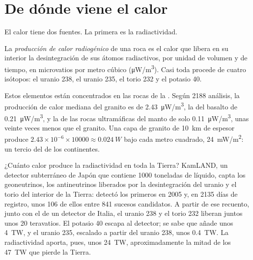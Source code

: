 \section{De dónde viene el calor}

El calor tiene dos fuentes. La primera es la radiactividad.

\begin{definition}\label{def:g12:internal-heat:heat-production}
La \emph{producción de calor radiogénico}
de una roca es el calor que libera en su interior la desintegración de sus
átomos radiactivos, por unidad de volumen y de tiempo, en microvatios por
metro cúbico (\unit{\micro W/m^3}). Casi toda procede de cuatro isótopos: el
uranio 238, el uranio 235, el torio 232 y el potasio 40.
\end{definition}

Estos elementos están concentrados en las rocas de la .
Según 2188 análisis, la producción de calor mediana del granito es de
\qty{2.43}{\micro W/m^3}, la del basalto de \qty{0.21}{\micro W/m^3}, y la de
las rocas ultramáficas del manto de solo \qty{0.11}{\micro W/m^3}, unas veinte
veces menos que el granito. Una capa de granito de \qty{10}{km} de espesor
produce
$2.43 \times 10^{-6} \times \num{10000} \approx \qty{0.024}{W}$ bajo cada
metro cuadrado, \qty{24}{mW/m^2}: un tercio del  de los
continentes.

¿Cuánto calor produce la radiactividad en toda la Tierra? KamLAND, un
detector subterráneo de Japón que contiene 1000 toneladas de líquido, capta
los geoneutrinos, los antineutrinos liberados por la desintegración del uranio
y el torio del interior de la Tierra: detectó los primeros en 2005 y, en 2135
días de registro, unos 106 de ellos entre 841 sucesos candidatos. A partir de
ese recuento, junto con el de un detector de Italia, el uranio 238 y el torio
232 liberan juntos unos 20 teravatios. El potasio 40 escapa al detector; se
sabe que añade unos \qty{4}{TW}, y el uranio 235, escalado a partir del
uranio 238, unos \qty{0.4}{TW}. La radiactividad aporta, pues, unos
\qty{24}{TW}, aproximadamente la mitad de los \qty{47}{TW} que pierde la
Tierra.

